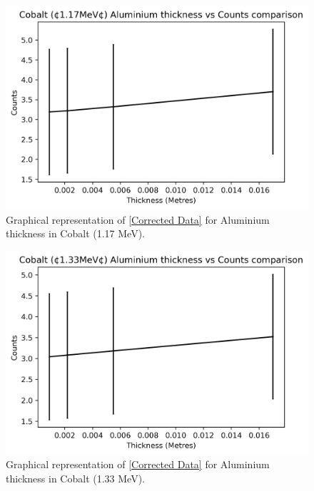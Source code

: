 \documentclass[12pt]{article}
\begin{document}
\begin{multicols}{2}
\begin{figure}[H]
\centering
\includegraphics[scale=0.6]{Images/CobaltAlu117Final.png}
\caption{Graphical representation of \cref{Corrected Data} for Aluminium thickness in Cobalt (1.17 MeV).}
\label{Cobalt 117 Alu Final Counts}
\end{figure}

\begin{figure}[H]
\centering
\includegraphics[scale=0.6]{Images/CobaltAlu133Final.png}
\caption{Graphical representation of \cref{Corrected Data} for Aluminium thickness in Cobalt (1.33 MeV).}
\label{Cobalt 133 Alu Final Counts}
\end{figure}
\end{multicols}
\end{document}
